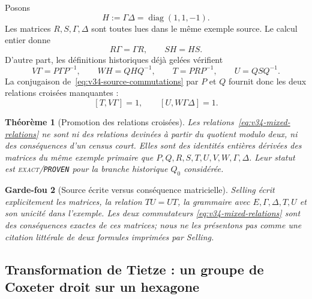 \documentclass[11pt,a4paper]{article}
\newtheorem{theorem}{Théorème}[section]
\newtheorem{guardrail}[theorem]{Garde-fou}
\newcommand{\statusExact}{\textsc{exact}}
\newcommand{\certProven}{\texttt{PROVEN}}
\begin{document}
Posons
\begin{equation}\label{eq:v34-H-def}
 H:=\Gamma\Delta=\operatorname{diag}(1,1,-1).
\end{equation}
Les matrices $R,S,\Gamma,\Delta$ sont toutes lues dans le même exemple source. Le calcul entier
donne
\begin{equation}\label{eq:v34-source-commutations}
 \boxed{R\Gamma=\Gamma R,\qquad SH=HS.}
\end{equation}
D'autre part, les définitions historiques déjà gelées vérifient
\begin{equation}\label{eq:v34-VW-conjugates}
 \boxed{
 V\Gamma=P\Gamma P^{-1},\qquad
 WH=QHQ^{-1},\qquad
 T=PRP^{-1},\qquad U=QSQ^{-1}.}
\end{equation}
La conjugaison de~\eqref{eq:v34-source-commutations} par $P$ et $Q$ fournit donc les deux
relations croisées manquantes :
\begin{equation}\label{eq:v34-mixed-relations}
 \boxed{
 [T,V\Gamma]=1,
 \qquad
 [U,W\Gamma\Delta]=1.}
\end{equation}

\begin{theorem}[Promotion des relations croisées]\label{thm:v34-mixed-source}
Les relations~\eqref{eq:v34-mixed-relations} ne sont ni des relations devinées à partir du quotient
modulo deux, ni des conséquences d'un census court. Elles sont des identités entières dérivées des
matrices du même exemple primaire que $P,Q,R,S,T,U,V,W,\Gamma,\Delta$. Leur statut est
\statusExact{}/\certProven{} pour la branche historique $Q_0$ considérée.
\end{theorem}

\begin{guardrail}[Source écrite versus conséquence matricielle]
Selling écrit explicitement les matrices, la relation $TU=UT$, la grammaire avec
$E,\Gamma,\Delta,T,U$ et son unicité dans l'exemple. Les deux commutateurs
\eqref{eq:v34-mixed-relations} sont des conséquences exactes de ces matrices; nous ne les présentons
pas comme une citation littérale de deux formules imprimées par Selling.
\end{guardrail}

\subsection{Transformation de Tietze : un groupe de Coxeter droit sur un hexagone}
\end{document}
